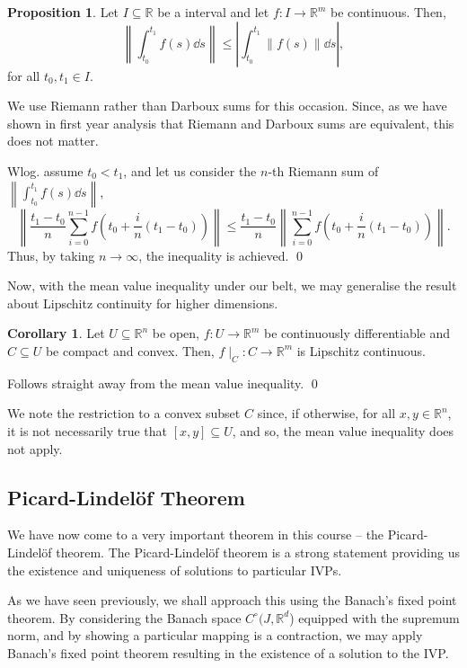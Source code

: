 \documentclass[
]{article}
\theoremstyle{definition}
\newtheorem{prop}{Proposition}
\newtheorem{corollary}{Corollary}[theorem]
\theoremstyle{definition}
\begin{document}
\begin{prop}
  Let \(I \subseteq \mathbb{R}\) be a interval and let \(f : I \to \mathbb{R}^m\) 
  be continuous. Then, 
  \[\left\|\int_{t_0}^{t_1} f(s) \dd s\right\| \le \left|\int_{t_0}^{t_1} \|f(s)\| \dd s\right|,\]
  for all \(t_0, t_1 \in I\).
\end{prop}
\proof

We use Riemann rather than Darboux sums for this occasion. Since, as we
have shown in first year analysis that Riemann and Darboux sums are
equivalent, this does not matter.

Wlog. assume \(t_0 < t_1\), and let us consider the \(n\)-th Riemann sum
of \(\left\|\int_{t_0}^{t_1} f(s) \dd s\right\|\),
\[\left\| \frac{t_1 - t_0}{n} 
    \sum_{i = 0}^{n - 1}f\left(t_0 + \frac{i}{n}(t_1 - t_0)\right)\right\| 
    \le \frac{t_1 - t_0}{n} 
    \left\|\sum_{i = 0}^{n - 1}f\left(t_0 + \frac{i}{n}(t_1 - t_0)\right)\right\|.\]
Thus, by taking \(n \to \infty\), the inequality is achieved. \qed

Now, with the mean value inequality under our belt, we may generalise
the result about Lipschitz continuity for higher dimensions.

\begin{corollary}
  Let \(U \subseteq \mathbb{R}^n\) be open, \(f : U \to \mathbb{R}^m\) be 
  continuously differentiable and \(C \subseteq U\) be compact and convex. 
  Then, \(f \mid_C : C \to \mathbb{R}^m\) is Lipschitz continuous.
\end{corollary}
\proof

Follows straight away from the mean value inequality. \qed

We note the restriction to a convex subset \(C\) since, if otherwise,
for all \(x, y \in \mathbb{R}^n\), it is not necessarily true that
\([x, y] \subseteq U\), and so, the mean value inequality does not
apply.

\hypertarget{picard-lindeluxf6f-theorem}{%
\subsection{Picard-Lindelöf Theorem}\label{picard-lindeluxf6f-theorem}}

We have now come to a very important theorem in this course -- the
Picard-Lindelöf theorem. The Picard-Lindelöf theorem is a strong
statement providing us the existence and uniqueness of solutions to
particular IVPs.

As we have seen previously, we shall approach this using the Banach's
fixed point theorem. By considering the Banach space
\(C^\circ(J, \mathbb{R}^d\)) equipped with the supremum norm, and by
showing a particular mapping is a contraction, we may apply Banach's
fixed point theorem resulting in the existence of a solution to the IVP.
\end{document}
